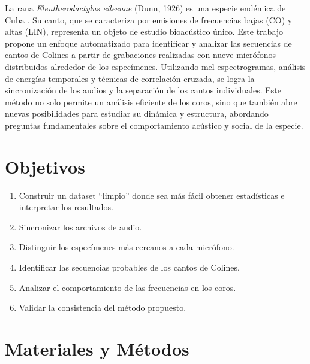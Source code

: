 \documentclass[a0,portrait]{a0poster}
\begin{document}
\begin{multicols}{3}
La rana \textit{Eleutherodactylus eileenae} (Dunn, 1926) es una especie endémica de Cuba \cite{Alonso:2001}. Su canto, que se caracteriza por emisiones de frecuencias bajas (CO) y altas (LIN), representa un objeto de estudio bioacústico único. Este trabajo propone un enfoque automatizado para identificar y analizar las secuencias de cantos de Colines a partir de grabaciones realizadas con nueve micrófonos distribuidos alrededor de los especímenes. Utilizando mel-espectrogramas, análisis de energías temporales y técnicas de correlación cruzada, se logra la sincronización de los audios y la separación de los cantos individuales. Este método no solo permite un análisis eficiente de los coros, sino que también abre nuevas posibilidades para estudiar su dinámica y estructura, abordando preguntas fundamentales sobre el comportamiento acústico y social de la especie.



\color{DarkSlateGray} %

\section*{Objetivos}

\begin{enumerate}
\item Construir un dataset “limpio” donde sea más fácil obtener
estadísticas e interpretar los resultados.
\item Sincronizar los archivos de audio.
\item Distinguir los especímenes más cercanos a cada micrófono.
\item Identificar las secuencias probables de los cantos de Colines.
\item Analizar el comportamiento de las frecuencias en los coros.
\item Validar la consistencia del método propuesto.
\end{enumerate}


\section*{Materiales y Métodos}


\end{multicols}
\end{document}
